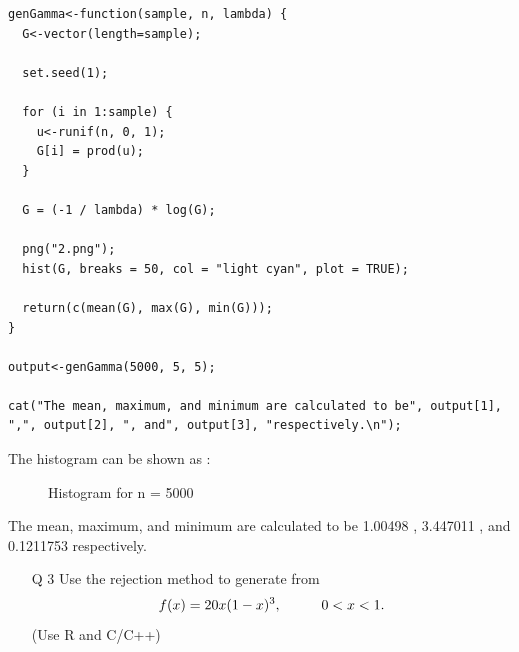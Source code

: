 \documentclass[11pt]{article}
\begin{document}

\begin{lstlisting}
genGamma<-function(sample, n, lambda) {
  G<-vector(length=sample);

  set.seed(1);

  for (i in 1:sample) {
    u<-runif(n, 0, 1);
    G[i] = prod(u);
  }

  G = (-1 / lambda) * log(G);

  png("2.png");
  hist(G, breaks = 50, col = "light cyan", plot = TRUE);

  return(c(mean(G), max(G), min(G)));
}

output<-genGamma(5000, 5, 5);

cat("The mean, maximum, and minimum are calculated to be", output[1], ",", output[2], ", and", output[3], "respectively.\n");

\end{lstlisting}
\newpage
{}

The histogram can be shown as :

\begin{figure}[H]
  \centering
    \caption{Histogram for n = 5000}
\end{figure}

The mean, maximum, and minimum are calculated to be 1.00498 , 3.447011 , and 0.1211753 respectively.

\newpage

\begin{enumerate}
\item[Q 3] Use the rejection method to generate from $$f(x) = 20x(1-x)^{3}, \hspace{10mm}0 < x < 1.$$
(Use R and C/C++)
\end{enumerate}
\end{document}
